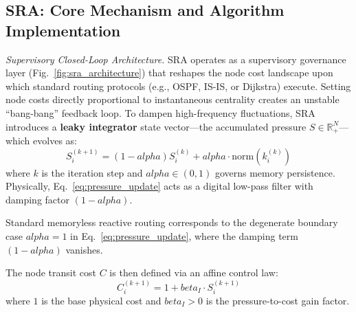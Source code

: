 \documentclass{ccjnl}
\def\kappa{k}%
\def\alpha{alpha}%
\def\beta{beta}%
\begin{document}
\subsection{SRA: Core Mechanism and Algorithm Implementation}
\label{subsec:sra_mechanism}

\textit{Supervisory Closed-Loop Architecture.} 
SRA operates as a supervisory governance layer (Fig.~\ref{fig:sra_architecture}) that reshapes the node cost landscape upon which standard routing protocols (e.g., OSPF, IS-IS, or Dijkstra) execute. Setting node costs directly proportional to instantaneous centrality creates an unstable ``bang-bang'' feedback loop. To dampen high-frequency fluctuations, SRA introduces a \textbf{leaky integrator} state vector---the accumulated pressure $S \in \mathbb{R}^N_+$---which evolves as:
\begin{equation}
    \label{eq:pressure_update}
    S_i^{(k+1)} = (1 - \alpha) S_i^{(k)} + \alpha \cdot \mathrm{norm}(\kappa_i^{(k)})
\end{equation}
where $k$ is the iteration step and $\alpha \in (0,1)$ governs memory persistence. Physically, Eq.~\eqref{eq:pressure_update} acts as a digital low-pass filter with damping factor $(1-\alpha)$.

\begin{remark}
\label{rem:reactive_routing}
Standard memoryless reactive routing corresponds to the degenerate boundary case $\alpha=1$ in Eq.~\eqref{eq:pressure_update}, where the damping term $(1-\alpha)$ vanishes.
\end{remark}

The node transit cost $C$ is then defined via an affine control law:
\begin{equation}
    \label{eq:cost_update}
    C_i^{(k+1)} = 1 + \beta_I \cdot S_i^{(k+1)}
\end{equation}
where $1$ is the base physical cost and $\beta_I > 0$ is the pressure-to-cost gain factor.
\end{document}
